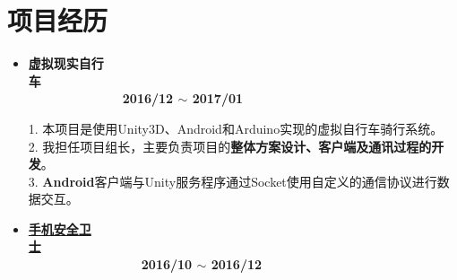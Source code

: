 \documentclass[letterpaper, UTF8, 11pt]{article}
\begin{document}
	\section*{\textbf{项目经历}}\vspace{-0.15in}
	\begin{itemize}	
		\item \textbf{虚拟现实自行车}~~~~~~~~~~~~~~~~~~~~~~~~~~~~~~~~~~~~~~~~~~~~~~~~~~~~~~~~~~~~~~~~~~~~~~~~~~~~~~~~~\textbf{2016/12 $\sim$ 2017/01}
		
		1. 本项目是使用Unity3D、Android和Arduino实现的虚拟自行车骑行系统。\\
		2. 我担任项目组长，主要负责项目的\textbf{整体方案设计、客户端及通讯过程的开发}。\\
		3. \textbf{Android}客户端与Unity服务程序通过Socket使用自定义的通信协议进行数据交互。
		\vspace{0.01in}
		
		\item \textbf{\href{https://github.com/Hepsilion/SecurityGuard}{手机安全卫士}}~~~~~~~~~~~~~~~~~~~~~~~~~~~~~~~~~~~~~~~~~~~~~~~~~~~~~~~~~~~~~~~~~~~~~~~~~~~~~~~~~~~~\textbf{2016/10 $\sim$ 2016/12}
		

\end{itemize}
\end{document}
